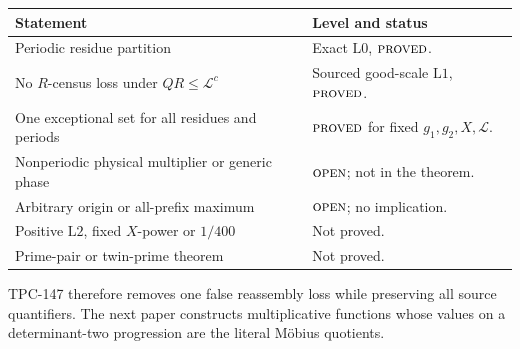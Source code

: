 \documentclass[11pt]{article}
\theoremstyle{definition}
\theoremstyle{remark}
\newcommand{\Lzero}{\mathrm{L0}}
\newcommand{\Lone}{\mathrm{L1}}
\newcommand{\Ltwo}{\mathrm{L2}}
\newcommand{\PROVED}{\textnormal{\textsc{proved}}}
\newcommand{\OPEN}{\textnormal{\textsc{open}}}
\begin{document}
\begin{center}
\small
\begin{tabularx}{\textwidth}{@{}p{}Y@{}}
\toprule
Statement & Level and status\\
\midrule
Periodic residue partition & Exact \(\Lzero\), \(\PROVED\).\\
No \(R\)-census loss under \(QR\le\mathcal L^c\) &
Sourced good-scale \(\Lone\), \(\PROVED\).\\
One exceptional set for all residues and periods &
\(\PROVED\) for fixed \(g_1,g_2,X,\mathcal L\).\\
Nonperiodic physical multiplier or generic phase &
\(\OPEN\); not in the theorem.\\
Arbitrary origin or all-prefix maximum &
\(\OPEN\); no implication.\\
Positive \(\Ltwo\), fixed \(X\)-power or \(1/400\) &
Not proved.\\
Prime-pair or twin-prime theorem & Not proved.\\
\bottomrule
\end{tabularx}
\end{center}

TPC-147 therefore removes one false reassembly loss while preserving
all source quantifiers.  The next paper constructs multiplicative
functions whose values on a determinant-two progression are the
literal M\"obius quotients.

\begingroup
\footnotesize
\raggedright


\endgroup
\end{document}

